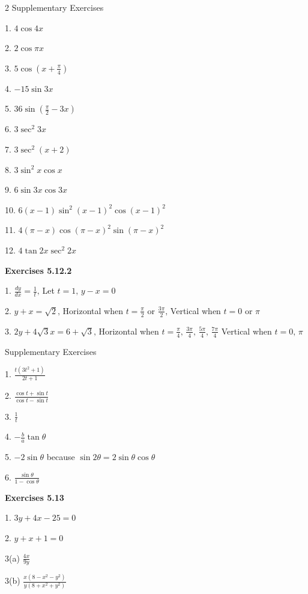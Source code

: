 \begin {multicols}{2}
Supplementary Exercises 

1. $4 \cos  4 x$ 

2. $2 \cos  \pi  x$ 

3. $5 \cos  \left (x +\frac{\pi }{4}\right )$ 

4. $ -15 \sin  3 x$ 

5. $36 \sin  \left (\frac{\pi }{2} -3 x\right )$ 

6. $3 \sec ^{2} 3 x$ 

7. $3 \sec ^{2} \left (x +2\right )$ 

8. $3 \sin ^{2} x \cos  x$ 

9. $6 \sin  3 x \cos  3 x$ 

10. $6 \left (x -1\right ) \sin ^{2} \left (x -1\right )^{2} \cos  \left (x -1\right )^{2}$ 

11. $4 \left (\pi  -x\right ) \cos  \left (\pi  -x\right )^{2} \sin  \left (\pi  -x\right )^{2}$ 

12. $4 \tan  2 x \sec ^{2} 2 x$ 

\textbf{Exercises 5.12.2} 

1. $\frac{d y}{d x} =\frac{1}{t}\text{,}$ Let $t =1\text{,}$ $y -x =0$ 

2. $y +x =\sqrt{2}\text{,}$ Horizontal when $t =\frac{\pi }{2}$ or $\frac{3 \pi }{2}\text{,}$ Vertical when $t =0$ or $\pi $ 

3. $2 y +4 \sqrt{3} x =6 +\sqrt{3}\text{,}$ Horizontal when $t =\frac{\pi }{4}\text{,}$ $\frac{3 \pi }{4}\text{,}$ $\frac{5 \pi }{4}\text{,}$ $\frac{7 \pi }{4}$ Vertical when $t =0\text{,}$ $\pi $ 

Supplementary Exercises 

1. $\frac{t \left (3 t^{2} +1\right )}{2 t +1}$ 

2. $\frac{\cos  t +\sin  t}{\cos  t -\sin  t}$ 

3. $\frac{1}{t}$ 

4. $ -\frac{b}{a} \tan  \theta $ 

5. $ -2 \sin  \theta $ because $\sin  2 \theta  =2 \sin  \theta  \cos  \theta $ 

6. $\frac{\sin  \theta }{1 -\cos  \theta }$ 

\textbf{Exercises 5.13} 

1. $3 y +4 x -25 =0$ 

2. $y +x +1 =0$ 

3(a) $\frac{4 x}{9 y}$ 

3(b) $\frac{x \left (8 -x^{2} -y^{2}\right )}{y \left (8 +x^{2} +y^{2}\right )}$ 


\end{multicols}
